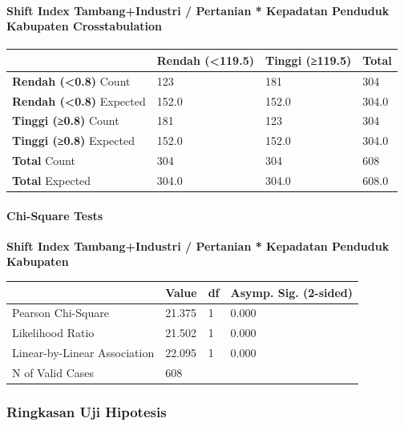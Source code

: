 \documentclass[
]{article}
\newcounter{none} %
\begin{document}
\paragraph{Shift Index Tambang+Industri / Pertanian * Kepadatan Penduduk
Kabupaten
Crosstabulation}\label{shift-index-tambangindustri-pertanian-kepadatan-penduduk-kabupaten-crosstabulation}

{\def\LTcaptype{none} %
\begin{longtable}[]{@{}llll@{}}
\toprule\noalign{}
& Rendah (\textless119.5) & Tinggi (≥119.5) & Total \\
\midrule\noalign{}
\endhead
\bottomrule\noalign{}
\endlastfoot
\textbf{Rendah (\textless0.8)} Count & 123 & 181 & 304 \\
\textbf{Rendah (\textless0.8)} Expected & 152.0 & 152.0 & 304.0 \\
\textbf{Tinggi (≥0.8)} Count & 181 & 123 & 304 \\
\textbf{Tinggi (≥0.8)} Expected & 152.0 & 152.0 & 304.0 \\
\textbf{Total} Count & 304 & 304 & 608 \\
\textbf{Total} Expected & 304.0 & 304.0 & 608.0 \\
\end{longtable}
}

\paragraph{Chi-Square Tests}\label{chi-square-tests}

\textbf{Shift Index Tambang+Industri / Pertanian * Kepadatan Penduduk
Kabupaten}

{\def\LTcaptype{none} %
\begin{longtable}[]{@{}llll@{}}
\toprule\noalign{}
& Value & df & Asymp. Sig. (2-sided) \\
\midrule\noalign{}
\endhead
\bottomrule\noalign{}
\endlastfoot
Pearson Chi-Square & 21.375 & 1 & 0.000 \\
Likelihood Ratio & 21.502 & 1 & 0.000 \\
Linear-by-Linear Association & 22.095 & 1 & 0.000 \\
N of Valid Cases & 608 & & \\
\end{longtable}
}

\subsubsection{Ringkasan Uji Hipotesis}\label{ringkasan-uji-hipotesis}
\end{document}
